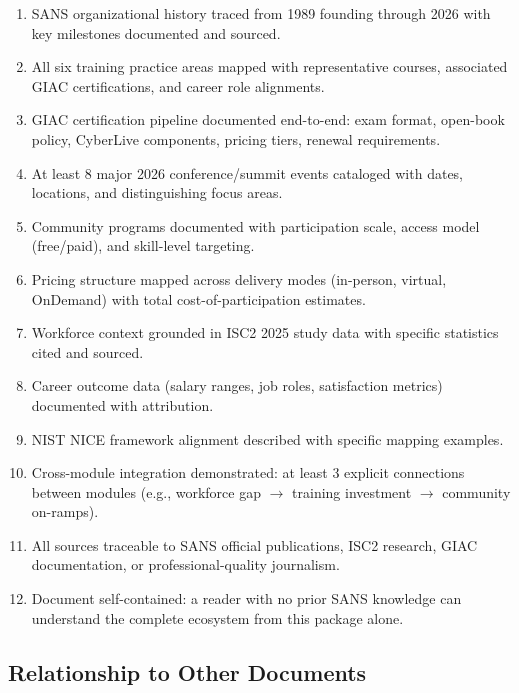 \documentclass[11pt,letterpaper]{article}
\begin{document}
\begin{enumerate}[label=\textbf{\arabic*.}]
  \item SANS organizational history traced from 1989 founding through 2026 with key milestones documented and sourced.
  \item All six training practice areas mapped with representative courses, associated GIAC certifications, and career role alignments.
  \item GIAC certification pipeline documented end-to-end: exam format, open-book policy, CyberLive components, pricing tiers, renewal requirements.
  \item At least 8 major 2026 conference/summit events cataloged with dates, locations, and distinguishing focus areas.
  \item Community programs documented with participation scale, access model (free/paid), and skill-level targeting.
  \item Pricing structure mapped across delivery modes (in-person, virtual, OnDemand) with total cost-of-participation estimates.
  \item Workforce context grounded in ISC2 2025 study data with specific statistics cited and sourced.
  \item Career outcome data (salary ranges, job roles, satisfaction metrics) documented with attribution.
  \item NIST NICE framework alignment described with specific mapping examples.
  \item Cross-module integration demonstrated: at least 3 explicit connections between modules (e.g., workforce gap $\rightarrow$ training investment $\rightarrow$ community on-ramps).
  \item All sources traceable to SANS official publications, ISC2 research, GIAC documentation, or professional-quality journalism.
  \item Document self-contained: a reader with no prior SANS knowledge can understand the complete ecosystem from this package alone.
\end{enumerate}

\subsection{Relationship to Other Documents}
\end{document}
